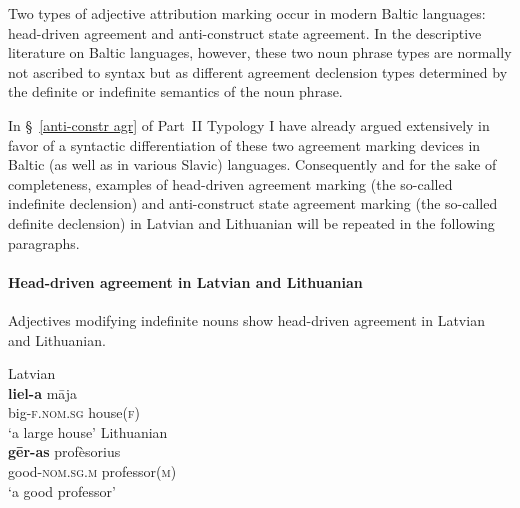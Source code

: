 Two types of adjective attribution marking occur in modern Baltic languages: head\hyp{}driven agreement and anti\hyp{}construct state agreement. In the descriptive literature on Baltic languages, however, these two noun phrase types are normally not ascribed to syntax but as different agreement declension types determined by the definite or indefinite semantics of the noun phrase.

In \S~\ref{anti-constr agr} of Part~II Typology I have already argued extensively in favor of a syntactic differentiation of these two agreement marking devices in Baltic (as well as in various Slavic) languages. Consequently and for the sake of completeness, examples of head\hyp{}driven agreement marking (the so-called indefinite declension) and anti\hyp{}construct state agreement marking (the so-called definite declension) in Latvian and Lithuanian will be repeated in the following paragraphs.

\paragraph*{Head\hyp{}driven agreement in Latvian and Lithuanian} 
Adjectives modifying indefinite nouns show head\hyp{}driven agreement in Latvian and Lithuanian.
\begin{exe}
\ex 
\begin{xlist}
\ex \rm{Latvian \citep[example from][122]{dahl2015a}}\\
\gll 	\textbf{liel-a} māja\\
	big-\textsc{f.nom.sg} house(\textsc{f})\\
\glt	‘a large house’
\ex \rm{Lithuanian \citep[13]{bechert1993}}\\
\gll 	\textbf{gēr-as}			profèsorius\\
	good-\textsc{nom.sg.m} professor(\textsc{m})\\
\glt	‘a good professor’
\end{xlist}
\end{exe}

